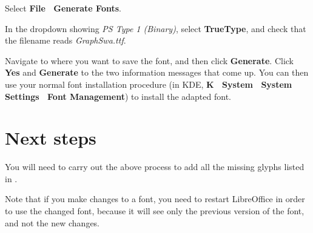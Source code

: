 Select \textbf{File \textrightarrow\ Generate Fonts}.

In the dropdown showing \textit{PS Type 1 (Binary)}, select \textbf{TrueType}, and check that the filename reads \textit{GraphSwa.ttf}.

Navigate to where you want to save the font, and then click \textbf{Generate}.  Click \textbf{Yes} and \textbf{Generate} to the two information messages that come up.  You can then use your normal font installation procedure (in KDE, \textbf{K \textrightarrow\ System \textrightarrow\ System Settings \textrightarrow\ Font Management}) to install the adapted font.

\section{Next steps}

You will need to carry out the above process to add all the missing glyphs listed in .

Note that if you make changes to a font, you need to restart LibreOffice in order to use the changed font, because it will see only the previous version of the font, and not the new changes.

